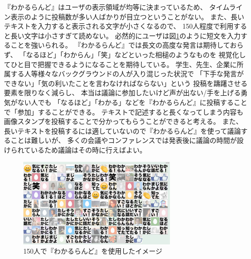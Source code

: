 『わかるらんど』はユーザの表示領域が均等に決まっているため、
タイムライン表示のように投稿数が多い人ばかりが目立つということがない。
また、長いテキストを入力すると表示される文字が小さくなるので、
150人程度で利用すると長い文字は小さすぎて読めない。
必然的にユーザは図\ref{wakaruland150}のように短文を入力することを強いられる。
『わかるらんど』では長文の高度な発言は期待しておらず、
「なるほど」「わからん」「笑」などといった相槌のようなものを
視覚化してひと目で把握できるようになることを期待している。
学生、先生、企業に所属する人等様々なバックグラウンドの人が入り混じった状況で
「下手な発言ができない」「気の利いたことを言わなければならない」という
投稿を躊躇させる要素を限りなく減らし、
本当は議論に参加したいけど声が出ない/手を上げる勇気がない人でも
「なるほど」「わかる」などを『わかるらんど』に投稿することで「参加」することができる。
テキストで記述すると長くなってしまう内容も
画像スタンプを投稿することで分かってもらうことができると考える。
また、長いテキストを投稿するには適していないので『わかるらんど』を使って議論することは難しいが、
多くの会議やコンファレンスでは発表後に議論の時間が設けられているため議論はその時に行えばよい。

\begin{figure}[h]
\centering
\includegraphics[width=8cm]{images/wakaruland150.png}
\caption{150人で『わかるらんど』を使用したイメージ}
\label{wakaruland150}
\end{figure}